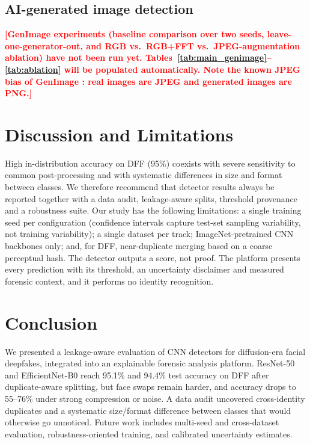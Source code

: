 \documentclass[conference]{IEEEtran}
\newcommand{\pending}[1]{\textcolor{red}{\textbf{[#1]}}}
\begin{document}
\subsection{AI-generated image detection}
\pending{GenImage experiments (baseline comparison over two seeds, leave-one-generator-out, and RGB vs.\ RGB+FFT vs.\ JPEG-augmentation ablation) have not been run yet. Tables~\ref{tab:main_genimage}--\ref{tab:ablation} will be populated automatically. Note the known JPEG bias of GenImage \cite{grommelt2024fake}: real images are JPEG and generated images are PNG.}





\section{Discussion and Limitations}
High in-distribution accuracy on DFF (95\%) coexists with severe sensitivity to common post-processing and with systematic differences in size and format between classes. We therefore recommend that detector results always be reported together with a data audit, leakage-aware splits, threshold provenance and a robustness suite. Our study has the following limitations: a single training seed per configuration (confidence intervals capture test-set sampling variability, not training variability); a single dataset per track; ImageNet-pretrained CNN backbones only; and, for DFF, near-duplicate merging based on a coarse perceptual hash. The detector outputs a score, not proof. The platform presents every prediction with its threshold, an uncertainty disclaimer and measured forensic context, and it performs no identity recognition.

\section{Conclusion}
We presented a leakage-aware evaluation of CNN detectors for diffusion-era facial deepfakes, integrated into an explainable forensic analysis platform. ResNet-50 and EfficientNet-B0 reach 95.1\% and 94.4\% test accuracy on DFF after duplicate-aware splitting, but face swaps remain harder, and accuracy drops to 55--76\% under strong compression or noise. A data audit uncovered cross-identity duplicates and a systematic size/format difference between classes that would otherwise go unnoticed. Future work includes multi-seed and cross-dataset evaluation, robustness-oriented training, and calibrated uncertainty estimates.
\end{document}
